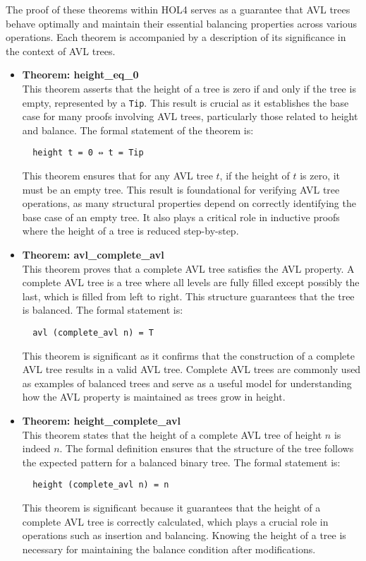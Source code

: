 \documentclass[12pt]{article}
\begin{document}
The proof of these theorems within HOL4 serves as a guarantee that AVL trees behave optimally and maintain their essential balancing properties across various operations. Each theorem is accompanied by a description of its significance in the context of AVL trees.

\begin{itemize}

  \item \textbf{Theorem: height\_eq\_0} \\
  This theorem asserts that the height of a tree is zero if and only if the tree is empty, represented by a \texttt{Tip}. This result is crucial as it establishes the base case for many proofs involving AVL trees, particularly those related to height and balance. The formal statement of the theorem is:
  \begin{verbatim}
  height t = 0 ⇔ t = Tip
 \end{verbatim}
  This theorem ensures that for any AVL tree \( t \), if the height of \( t \) is zero, it must be an empty tree. This result is foundational for verifying AVL tree operations, as many structural properties depend on correctly identifying the base case of an empty tree. It also plays a critical role in inductive proofs where the height of a tree is reduced step-by-step.

  \item \textbf{Theorem: avl\_complete\_avl} \\
  This theorem proves that a complete AVL tree satisfies the AVL property. A complete AVL tree is a tree where all levels are fully filled except possibly the last, which is filled from left to right. This structure guarantees that the tree is balanced. The formal statement is:
  \begin{verbatim}
  avl (complete_avl n) = T
  \end{verbatim}
  This theorem is significant as it confirms that the construction of a complete AVL tree results in a valid AVL tree. Complete AVL trees are commonly used as examples of balanced trees and serve as a useful model for understanding how the AVL property is maintained as trees grow in height.

  \item \textbf{Theorem: height\_complete\_avl} \\
  This theorem states that the height of a complete AVL tree of height \( n \) is indeed \( n \). The formal definition ensures that the structure of the tree follows the expected pattern for a balanced binary tree. The formal statement is:
  \begin{verbatim}
  height (complete_avl n) = n
  \end{verbatim}
  This theorem is significant because it guarantees that the height of a complete AVL tree is correctly calculated, which plays a crucial role in operations such as insertion and balancing. Knowing the height of a tree is necessary for maintaining the balance condition after modifications.


\end{itemize}
\end{document}
